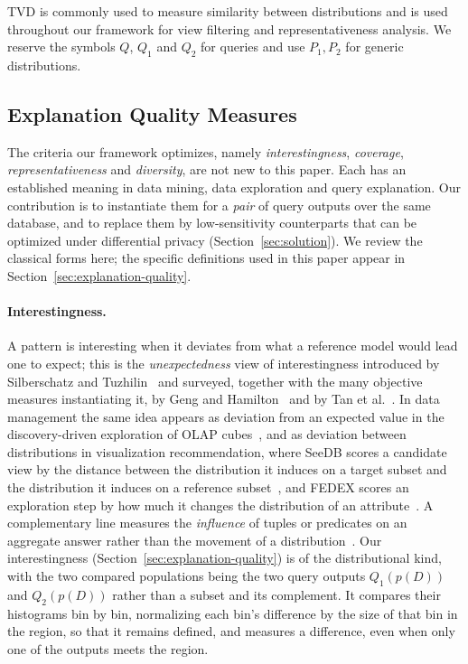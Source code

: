 TVD is commonly used to measure similarity between distributions and is used
throughout our framework for view filtering and representativeness analysis.
We reserve the symbols $Q$, $Q_1$ and $Q_2$ for queries and use $P_1,P_2$ for
generic distributions.

\subsection{Explanation Quality Measures}
\label{subsec:prelim-quality}

The criteria our framework optimizes, namely \emph{interestingness},
\emph{coverage}, \emph{representativeness} and \emph{diversity}, are not new to
this paper.
Each has an established meaning in data mining, data exploration and query
explanation.
Our contribution is to instantiate them for a \emph{pair} of query outputs over the
same database, and to replace them by low-sensitivity counterparts that can be
optimized under differential privacy (Section~\ref{sec:solution}).
We review the classical forms here; the specific definitions used in this paper
appear in Section~\ref{sec:explanation-quality}.

\paragraph{Interestingness.}
A pattern is interesting when it deviates from what a reference model would lead one
to expect; this is the \emph{unexpectedness} view of interestingness introduced by
Silberschatz and Tuzhilin~\cite{SilberschatzT96} and surveyed, together with the
many objective measures instantiating it, by Geng and
Hamilton~\cite{GengHamilton06} and by Tan et al.~\cite{TanKS02}.
In data management the same idea appears as deviation from an expected value in the
discovery-driven exploration of OLAP cubes~\cite{Sarawagi98}, and as
deviation between distributions in visualization recommendation, where SeeDB scores a
candidate view by the distance between the distribution it induces on a target
subset and the distribution it induces on a reference subset~\cite{SeeDB}, and
FEDEX scores an exploration step by how much it changes the distribution of an
attribute~\cite{FEDEX}.
A complementary line measures the \emph{influence} of tuples or predicates on an
aggregate answer rather than the movement of a distribution~\cite{wu2013,RoyS14}.
Our interestingness (Section~\ref{sec:explanation-quality}) is of the
distributional kind, with the two compared populations being the two query outputs
$Q_1(p(D))$ and $Q_2(p(D))$ rather than a subset and its complement.
It compares their histograms bin by bin, normalizing each bin's difference by the
size of that bin in the region, so that it remains defined, and measures a
difference, even when only one of the outputs meets the region.

